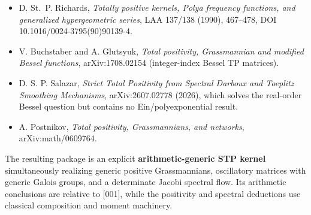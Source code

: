 \begin{itemize}
\tightlist
\item
  D. St.~P. Richards, \emph{Totally positive kernels, Polya frequency functions,
  and generalized hypergeometric series}, LAA 137/138 (1990), 467--478,
  DOI 10.1016/0024-3795(90)90139-4.
\item
  V. Buchstaber and A. Glutsyuk, \emph{Total positivity, Grassmannian and modified
  Bessel functions}, arXiv:1708.02154 (integer-index Bessel TP matrices).
\item
  D. S. P. Salazar, \emph{Strict Total Positivity from Spectral Darboux and Toeplitz
  Smoothing Mechanisms}, arXiv:2607.02778 (2026), which solves the real-order
  Bessel question but contains no Ein/polyexponential result.
\item
  A. Postnikov, \emph{Total positivity, Grassmannians, and networks},
  arXiv:math/0609764.
\end{itemize}

The resulting package is an explicit \textbf{arithmetic-generic STP kernel}
simultaneously realizing generic positive Grassmannians, oscillatory matrices
with generic Galois groups, and a determinate Jacobi spectral flow.  Its
arithmetic conclusions are relative to [001], while the positivity and
spectral deductions use classical composition and moment machinery.
